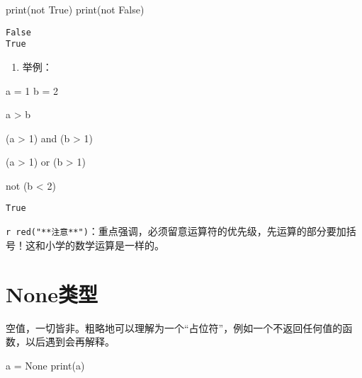 \documentclass[
  letterpaper,
  DIV=11,
  numbers=noendperiod]{scrreprt}
\newenvironment{Shaded}{\begin{snugshade}}{\end{snugshade}}
\newcommand{\BuiltInTok}[1]{\textcolor[rgb]{0.00,0.23,0.31}{#1}}
\newcommand{\DecValTok}[1]{\textcolor[rgb]{0.68,0.00,0.00}{#1}}
\newcommand{\KeywordTok}[1]{\textcolor[rgb]{0.00,0.23,0.31}{#1}}
\newcommand{\NormalTok}[1]{\textcolor[rgb]{0.00,0.23,0.31}{#1}}
\newcommand{\OperatorTok}[1]{\textcolor[rgb]{0.37,0.37,0.37}{#1}}
\newcommand{\VariableTok}[1]{\textcolor[rgb]{0.07,0.07,0.07}{#1}}
\providecommand{\tightlist}{%
  \setlength{\itemsep}{0pt}\setlength{\parskip}{0pt}}\usepackage{longtable,booktabs,array}
\begin{document}
\begin{Shaded}
\begin{Highlighting}[]
\BuiltInTok{print}\NormalTok{(}\KeywordTok{not} \VariableTok{True}\NormalTok{)}
\BuiltInTok{print}\NormalTok{(}\KeywordTok{not} \VariableTok{False}\NormalTok{)}
\end{Highlighting}
\end{Shaded}

\begin{verbatim}
False
True
\end{verbatim}

\begin{enumerate}
\def\labelenumi{\arabic{enumi}.}
\setcounter{enumi}{3}
\tightlist
\item
  举例：
\end{enumerate}

\begin{Shaded}
\begin{Highlighting}[]
\NormalTok{a }\OperatorTok{=} \DecValTok{1}
\NormalTok{b }\OperatorTok{=} \DecValTok{2}

\NormalTok{a }\OperatorTok{\textgreater{}}\NormalTok{ b}

\NormalTok{(a }\OperatorTok{\textgreater{}} \DecValTok{1}\NormalTok{) }\KeywordTok{and}\NormalTok{ (b }\OperatorTok{\textgreater{}} \DecValTok{1}\NormalTok{)}

\NormalTok{(a }\OperatorTok{\textgreater{}} \DecValTok{1}\NormalTok{) }\KeywordTok{or}\NormalTok{ (b }\OperatorTok{\textgreater{}} \DecValTok{1}\NormalTok{)}

\KeywordTok{not}\NormalTok{ (b }\OperatorTok{\textless{}} \DecValTok{2}\NormalTok{)}
\end{Highlighting}
\end{Shaded}

\begin{verbatim}
True
\end{verbatim}

\texttt{r\ red("**注意**")}：重点强调，必须留意运算符的优先级，先运算的部分要加括号！这和小学的数学运算是一样的。

\hypertarget{noneux7c7bux578b}{%
\section{None类型}\label{noneux7c7bux578b}}

空值，一切皆非。粗略地可以理解为一个``占位符''，例如一个不返回任何值的函数，以后遇到会再解释。

\begin{Shaded}
\begin{Highlighting}[]
\NormalTok{a }\OperatorTok{=} \VariableTok{None}
\BuiltInTok{print}\NormalTok{(a)}
\end{Highlighting}
\end{Shaded}
\end{document}
